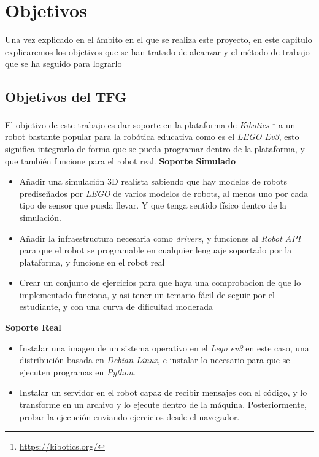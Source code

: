 \chapter{Objetivos}\label{chap:objetivos}
Una vez explicado en el ámbito en el que se realiza este proyecto, en este capitulo explicaremos los objetivos que se han tratado de alcanzar y el método de trabajo que se ha seguido para lograrlo

\section{Objetivos del TFG}
El objetivo de este trabajo es dar soporte en la plataforma de \textit{Kibotics} \footnote{\url{https://kibotics.org/}} a un robot bastante popular para la robótica educativa como es el \textit{LEGO Ev3}, esto significa integrarlo de forma que se pueda programar dentro de la plataforma, y que también funcione para el robot real.\newline 
\textbf{Soporte Simulado}
\begin{itemize}
    \item Añadir una simulación 3D realista sabiendo que hay modelos de robots prediseñados por \textit{LEGO} de varios modelos de robots, al menos uno por cada tipo de sensor que pueda llevar. Y que tenga sentido físico dentro de la simulación.
        
    \item Añadir la infraestructura necesaria como \textit{drivers}, y funciones al \textit{Robot API} para que el robot se programable en cualquier lenguaje soportado por la plataforma, y funcione en el robot real
    
    \item Crear un conjunto de ejercicios para que haya una comprobacion de que lo implementado funciona, y asi tener un temario fácil de seguir por el estudiante, y con una curva de dificultad moderada
    
\end{itemize}
\textbf{Soporte Real}
\begin{itemize}
    \item Instalar una imagen de un sistema operativo en el \textit{Lego ev3} en este caso, una distribución basada en \textit{Debian Linux}, e instalar lo necesario para que se ejecuten programas en \textit{Python}.
    \item Instalar un servidor en el robot capaz de recibir mensajes con el código, y lo transforme en un archivo y lo ejecute dentro de la máquina. Posteriormente, probar la ejecución enviando ejercicios desde el navegador.
    
\end{itemize}

